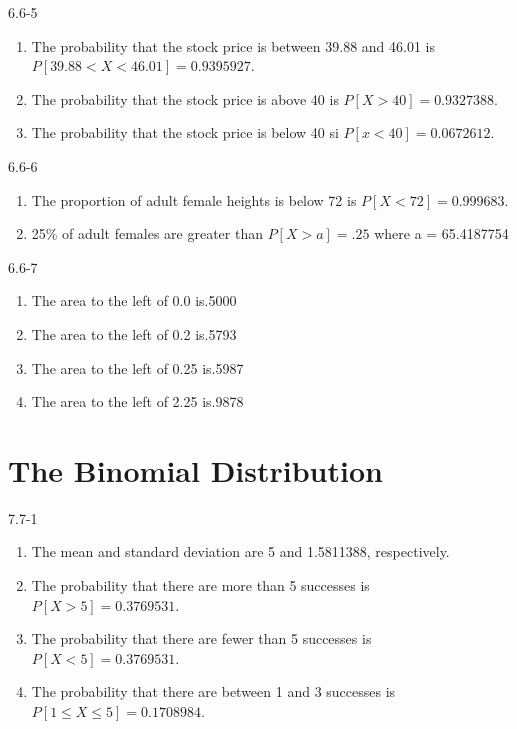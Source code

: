 \begin{exsol@solution}{6.6-5}

\begin{enumerate}
\item The probability that the stock price is between 39.88 and 46.01 is $P[39.88 < X < 46.01] = 0.9395927$.
\item The probability that the stock price is above 40 is $P[X > 40] = 0.9327388$.
\item The probability that the stock price is below 40 si $P[ x < 40] = 0.0672612$.
\end{enumerate}
\end{exsol@solution}
\begin{exsol@solution}{6.6-6}

\begin{enumerate}
\item The proportion of adult female heights is below 72 is $P[ X < 72] = 0.999683$.
\item 25\% of adult females are greater than $P[ X > a] = .25$ where a = 65.4187754
\end{enumerate}
\end{exsol@solution}
\begin{exsol@solution}{6.6-7}
\begin{enumerate}
\item The area to the left of 0.0 is.5000
\item The area to the left of 0.2 is.5793
\item The area to the left of 0.25 is.5987
\item The area to the left of 2.25 is.9878
\end{enumerate}
\end{exsol@solution}
\setcounter{chapter}{7}\chapter{The Binomial Distribution}
\begin{exsol@solution}{7.7-1}

		\begin{enumerate}
	  \item The mean and standard deviation are 5 and 1.5811388, respectively.
    \item The probability that there are more than 5 successes is $P[ X > 5 ] = 0.3769531$.
    \item The probability that there are fewer than 5 successes is $P[ X < 5 ] = 0.3769531$.
    \item The probability that there  are between 1 and 3 successes  is $P[ 1 \le X \le 5 ] = 0.1708984$.
	  \end{enumerate}
\end{exsol@solution}
